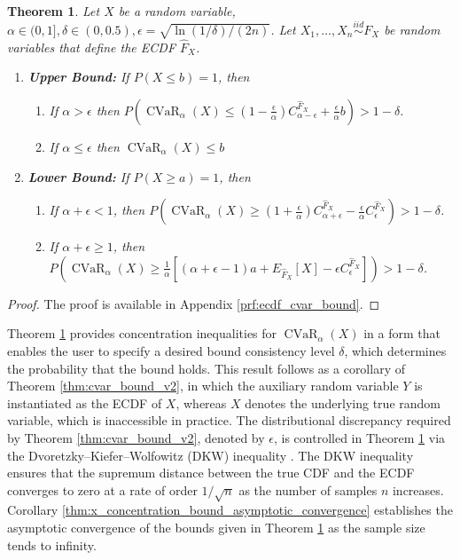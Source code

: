\documentclass[acmlarge, manuscript, screen, review, natbib=false, oneside]{acmart}
\newtheorem{theorem}{Theorem}[section]
\DeclareMathOperator{\CVaR}{CVaR}
\begin{document}
\begin{theorem}
	\label{thm:ecdf_cvar_bound}
	Let $X$ be a random variable, $\alpha\in (0, 1],\delta \in (0, 0.5), \epsilon=\sqrt{\ln(1/\delta)/(2n)}$. Let $X_1, \dots, X_n \overset{iid}{\sim} F_X$ be random variables that define the ECDF $\hat{F}_X$.
	\begin{enumerate}
		\item \textbf{Upper Bound:} If $P(X\leq b)=1$, then
		\begin{enumerate}
			\item If $\alpha > \epsilon$ then $P(\CVaR_\alpha(X) \leq (1-\frac{\epsilon}{\alpha})C_{\alpha-\epsilon}^{\hat{F}_X} + \frac{\epsilon}{\alpha}b)> 1-\delta$.
			
			\item If $\alpha\leq \epsilon$ then $\CVaR_\alpha(X)\leq b$
		\end{enumerate}
		
		\item \textbf{Lower Bound:} If $P(X\geq a)=1$, then 
		\begin{enumerate}
			\item If $\alpha+\epsilon < 1$, then $P(\CVaR_\alpha(X)\geq (1+\frac{\epsilon}{\alpha})C_{\alpha+\epsilon}^{\hat{F}_X}-\frac{\epsilon}{\alpha}C_{\epsilon}^{\hat{F}_X})> 1-\delta$.
			
			\item If $\alpha+\epsilon \geq 1$, then $P(\CVaR_\alpha(X) \geq \frac{1}{\alpha}[(\alpha+\epsilon - 1)a + E_{\hat{F}_X}[X] - \epsilon C_\epsilon^{\hat{F}_X}]) > 1-\delta$.
		\end{enumerate}
	\end{enumerate}
\end{theorem}
\begin{proof}
	The proof is available in Appendix \ref{prf:ecdf_cvar_bound}.
\end{proof}
Theorem \ref{thm:ecdf_cvar_bound} provides concentration inequalities for $\CVaR_\alpha(X)$ in a form that enables the user to specify a desired bound consistency level $\delta$, which determines the probability that the bound holds. This result follows as a corollary of Theorem \ref{thm:cvar_bound_v2}, in which the auxiliary random variable $Y$ is instantiated as the ECDF of $X$, whereas $X$ denotes the underlying true random variable, which is inaccessible in practice. The distributional discrepancy required by Theorem \ref{thm:cvar_bound_v2}, denoted by $\epsilon$, is controlled in Theorem \ref{thm:ecdf_cvar_bound} via the Dvoretzky–Kiefer–Wolfowitz (DKW) inequality \cite{DKW_inequality}. The DKW inequality ensures that the supremum distance between the true CDF and the ECDF converges to zero at a rate of order $1/\sqrt{n}$ as the number of samples $n$ increases. Corollary \ref{thm:x_concentration_bound_asymptotic_convergence} establishes the asymptotic convergence of the bounds given in Theorem \ref{thm:ecdf_cvar_bound} as the sample size tends to infinity.
\end{document}
